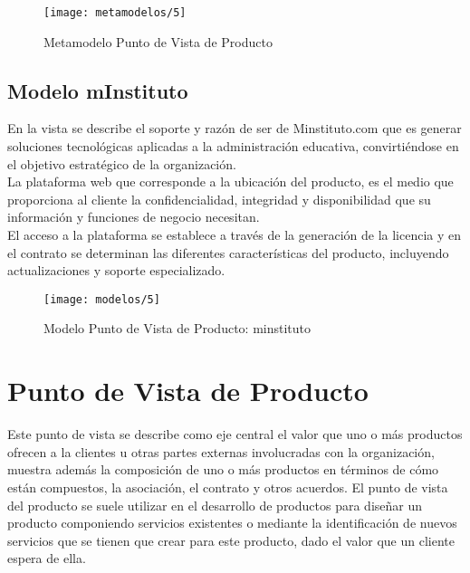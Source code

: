   \begin{figure}[H]
  	\centering
  	\texttt{[image: metamodelos/5]}
  	\captionsetup{width=.95\textwidth}
  	\caption{Metamodelo Punto de Vista de Producto}
  	\label{metamodelo5}
  \end{figure}
  
  \subsection{Modelo mInstituto}
  En la vista se describe el soporte y razón de ser de Minstituto.com que es generar soluciones tecnológicas aplicadas a la administración educativa, convirtiéndose en el objetivo estratégico de la organización. \\
  
  La plataforma web que corresponde a la ubicación del producto, es el medio que proporciona al cliente la confidencialidad, integridad y disponibilidad que su información y funciones de negocio necesitan. \\
  
  El acceso a la plataforma se establece a través de la generación de la licencia y en el contrato se determinan las diferentes características del producto, incluyendo actualizaciones y soporte especializado.
  
  \begin{figure}[H]
  	\centering
  	\texttt{[image: modelos/5]}
  	\captionsetup{width=.95\textwidth}
  	\caption{Modelo Punto de Vista de Producto: minstituto}
  	\label{modelo5}
  \end{figure}
  
\section{Punto de Vista de Producto}
Este punto de vista se describe como eje central el valor que uno o más productos ofrecen a la clientes u otras partes externas involucradas con la organización, muestra además la composición de uno o más productos en términos de cómo están compuestos, la asociación, el contrato y otros acuerdos. El punto de vista del producto se suele utilizar en el desarrollo de productos para diseñar un producto componiendo servicios existentes o mediante la identificación de nuevos servicios que se tienen que crear para este producto, dado el valor que un cliente espera de ella.

